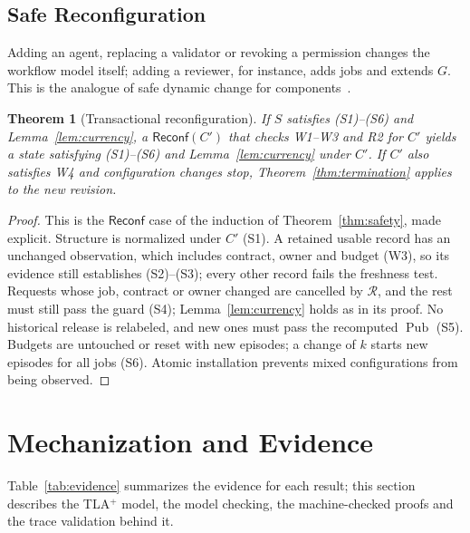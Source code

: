 \documentclass[pdflatex,sn-mathphys-num]{sn-jnl}
\theoremstyle{thmstyleone}%
\newtheorem{theorem}{Theorem}%
\theoremstyle{thmstyletwo}%
\theoremstyle{thmstylethree}%
\newcommand{\Pub}{\operatorname{Pub}}
\newcommand{\tla}{TLA$^+$}
\begin{document}
\subsection{Safe Reconfiguration}
Adding an agent, replacing a validator or revoking a permission changes the workflow model itself; adding a reviewer, for instance, adds jobs and extends $G$. This is the analogue of safe dynamic change for components~\cite{kramer1990evolving}.

\begin{theorem}[Transactional reconfiguration]\label{thm:reconfig}
If $S$ satisfies (S1)--(S6) and Lemma~\ref{lem:currency}, a $\mathsf{Reconf}(C')$ that checks W1--W3 and R2 for $C'$ yields a state satisfying (S1)--(S6) and Lemma~\ref{lem:currency} under $C'$. If $C'$ also satisfies W4 and configuration changes stop, Theorem~\ref{thm:termination} applies to the new revision.
\end{theorem}
\begin{proof}
This is the $\mathsf{Reconf}$ case of the induction of Theorem~\ref{thm:safety}, made explicit. Structure is normalized under $C'$ (S1). A retained usable record has an unchanged observation, which includes contract, owner and budget (W3), so its evidence still establishes (S2)--(S3); every other record fails the freshness test. Requests whose job, contract or owner changed are cancelled by $\mathcal R$, and the rest must still pass the guard (S4); Lemma~\ref{lem:currency} holds as in its proof. No historical release is relabeled, and new ones must pass the recomputed $\Pub$ (S5). Budgets are untouched or reset with new episodes; a change of $k$ starts new episodes for all jobs (S6). Atomic installation prevents mixed configurations from being observed.
\end{proof}

\section{Mechanization and Evidence}\label{sec:mech}
Table~\ref{tab:evidence} summarizes the evidence for each result; this section describes the \tla{} model, the model checking, the machine-checked proofs and the trace validation behind it.
\end{document}
